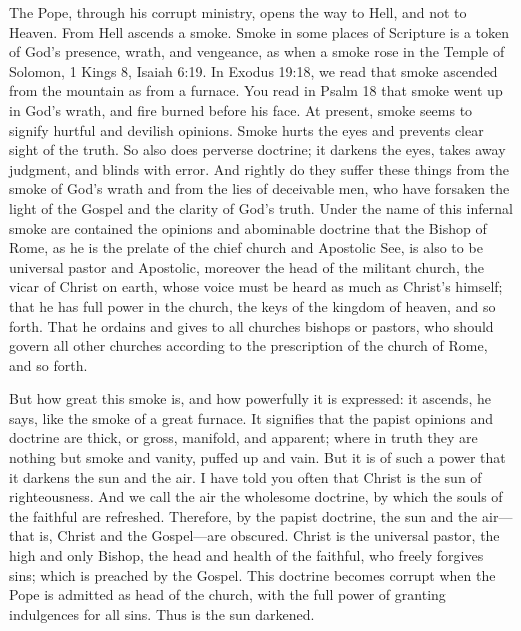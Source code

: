 The Pope, through his corrupt ministry, opens the way to Hell, and not to Heaven. From Hell ascends a smoke. Smoke in some places of Scripture is a token of God’s presence, wrath, and vengeance, as when a smoke rose in the Temple of Solomon, 1 Kings 8, Isaiah 6:19. In Exodus 19:18, we read that smoke ascended from the mountain as from a furnace. You read in Psalm 18 that smoke went up in God’s wrath, and fire burned before his face. At present, smoke seems to signify hurtful and devilish opinions. Smoke hurts the eyes and prevents clear sight of the truth. So also does perverse doctrine; it darkens the eyes, takes away judgment, and blinds with error. And rightly do they suffer these things from the smoke of God’s wrath and from the lies of deceivable men, who have forsaken the light of the Gospel and the clarity of God’s truth. Under the name of this infernal smoke are contained the opinions and abominable doctrine that the Bishop of Rome, as he is the prelate of the chief church and Apostolic See, is also to be universal pastor and Apostolic, moreover the head of the militant church, the vicar of Christ on earth, whose voice must be heard as much as Christ’s himself; that he has full power in the church, the keys of the kingdom of heaven, and so forth. That he ordains and gives to all churches bishops or pastors, who should govern all other churches according to the prescription of the church of Rome, and so forth.

But how great this smoke is, and how powerfully it is expressed: it ascends, he says, like the smoke of a great furnace. It signifies that the papist opinions and doctrine are thick, or gross, manifold, and apparent; where in truth they are nothing but smoke and vanity, puffed up and vain. But it is of such a power that it darkens the sun and the air. I have told you often that Christ is the sun of righteousness. And we call the air the wholesome doctrine, by which the souls of the faithful are refreshed. Therefore, by the papist doctrine, the sun and the air—that is, Christ and the Gospel—are obscured. Christ is the universal pastor, the high and only Bishop, the head and health of the faithful, who freely forgives sins; which is preached by the Gospel. This doctrine becomes corrupt when the Pope is admitted as head of the church, with the full power of granting indulgences for all sins. Thus is the sun darkened.

